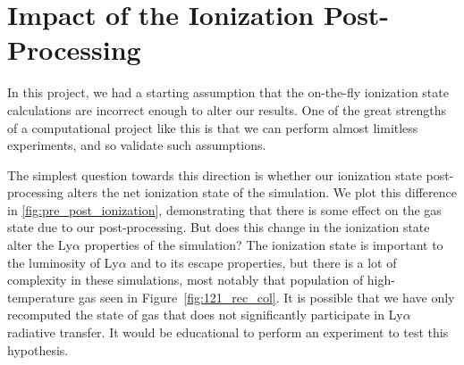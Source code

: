 \section{Impact of the Ionization Post-Processing}

In this project, we had a starting assumption that the on-the-fly ionization state calculations are incorrect enough to alter our results.
One of the great strengths of a computational project like this is that we can perform almost limitless experiments, and so validate such assumptions.

The simplest question towards this direction is whether our ionization state post-processing alters the net ionization state of the simulation.
We plot this difference in \ref{fig:pre_post_ionization}, demonstrating that there is some effect on the gas state due to our post-processing.
But does this change in the ionization state alter the Ly$\alpha$ properties of the simulation?
The ionization state is important to the luminosity of Ly$\alpha$ and to its escape properties, but there is a lot of complexity in these simulations, most notably that population of high-temperature gas seen in Figure~\ref{fig:121_rec_col}.
It is possible that we have only recomputed the state of gas that does not significantly participate in Ly$\alpha$ radiative transfer.
It would be educational to perform an experiment to test this hypothesis.


